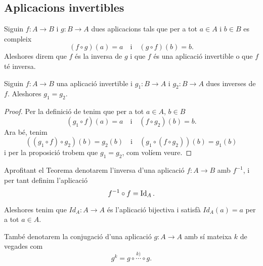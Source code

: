 \documentclass[../Apunts.tex]{subfiles}
\begin{document}
	\subsection{Aplicacions invertibles}
	\begin{definition}
		\label{def:aplicació invertible}
		\label{def:inversa d'una aplicació}
		Siguin \(f\colon A\rightarrow B\) i \(g\colon B\rightarrow A\) dues aplicacions tals que per a tot \(a\in A\) i \(b\in B\) es compleix
		\[(f\circ g)(a)=a\quad\text{i}\quad(g\circ f)(b)=b.\]
		Aleshores direm que \(f\) és la inversa de \(g\) i que \(f\) és una aplicació invertible o que \(f\) té inversa.
	\end{definition}
	\begin{theorem}
		\label{thm:unicitat de les inverses de les aplicacions bijectives}
		Siguin \(f\colon A\rightarrow B\) una aplicació invertible i \(g_{1}\colon B\rightarrow A\) i \(g_{2}\colon B\rightarrow A\) dues inverses de \(f\). Aleshores \(g_{1}=g_{2}\).
		\begin{proof}
			Per la definició de  tenim que per a tot \(a\in A\), \(b\in B\)
			\[(g_{1}\circ f)(a)=a\quad\text{i}\quad(f\circ g_{2})(b)=b.\]
			Ara bé, tenim
			\[((g_{1}\circ f)\circ g_{2})(b)=g_{2}(b)\quad\text{i}\quad(g_{1}\circ(f\circ g_{2}))(b)=g_{1}(b)\]
			i per la proposició  trobem que \(g_{1}=g_{2}\), com volíem veure.
		\end{proof}
	\end{theorem}
	\begin{notation}
		Aprofitant el Teorema  denotarem l'inversa d'una aplicació \(f:A\rightarrow B\) amb \(f^{-1}\), i per tant definim l'aplicació
		\[f^{-1}\circ f=\operatorname{Id}_{A}.\]
		
		Aleshores tenim que \(Id_{A}\colon A\rightarrow A\) és l'aplicació bijectiva i satisfà \(Id_{A}(a)=a\) per a tot \(a\in A\).
		
		També denotarem la conjugació d'una aplicació \(g\colon A\rightarrow A\) amb sí mateixa \(k\) de vegades com \[g^{k}=g\circ\overset{k)}{\cdots}\circ g.\]
	\end{notation}
\end{document}
